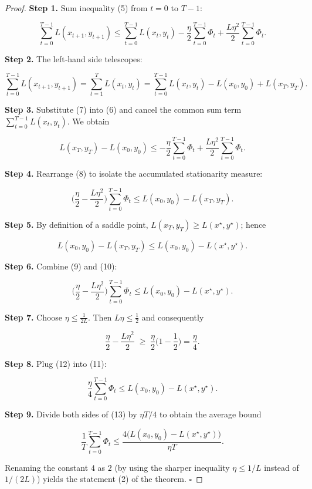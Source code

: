 \documentclass{article}
\begin{document}
\begin{proof}
\textbf{Step 1.}  Sum inequality (5) from \(t=0\) to \(T-1\):

\[
\sum_{t=0}^{T-1}L(x_{t+1},y_{t+1})
\le
\sum_{t=0}^{T-1}L(x_t,y_t)
-\frac{\eta}{2}\sum_{t=0}^{T-1}\Phi_t
+\frac{L\eta^2}{2}\sum_{t=0}^{T-1}\Phi_t .
\tag{6}
\]

\textbf{Step 2.}  The left‑hand side telescopes:

\[
\sum_{t=0}^{T-1}L(x_{t+1},y_{t+1})
=
\sum_{t=1}^{T}L(x_{t},y_{t})
=
\sum_{t=0}^{T-1}L(x_{t},y_{t})-L(x_0,y_0)+L(x_T,y_T).
\tag{7}
\]

\textbf{Step 3.}  Substitute (7) into (6) and cancel the common sum term \(\sum_{t=0}^{T-1}L(x_t,y_t)\). We obtain

\[
L(x_T,y_T)-L(x_0,y_0)
\le
-\frac{\eta}{2}\sum_{t=0}^{T-1}\Phi_t
+\frac{L\eta^2}{2}\sum_{t=0}^{T-1}\Phi_t .
\tag{8}
\]

\textbf{Step 4.}  Rearrange (8) to isolate the accumulated stationarity measure:

\[
\Big(\frac{\eta}{2}-\frac{L\eta^2}{2}\Big)\sum_{t=0}^{T-1}\Phi_t
\le
L(x_0,y_0)-L(x_T,y_T).
\tag{9}
\]

\textbf{Step 5.}  By definition of a saddle point, \(L(x_T,y_T)\ge L(x^\star,y^\star)\); hence

\[
L(x_0,y_0)-L(x_T,y_T)\le L(x_0,y_0)-L(x^\star,y^\star).
\tag{10}
\]

\textbf{Step 6.}  Combine (9) and (10):

\[
\Big(\frac{\eta}{2}-\frac{L\eta^2}{2}\Big)\sum_{t=0}^{T-1}\Phi_t
\le
L(x_0,y_0)-L(x^\star,y^\star).
\tag{11}
\]

\textbf{Step 7.}  Choose \(\eta\le\frac{1}{2L}\). Then \(L\eta\le\frac12\) and consequently  

\[
\frac{\eta}{2}-\frac{L\eta^2}{2}
\;\ge\;
\frac{\eta}{2}\Big(1-\frac12\Big)
=
\frac{\eta}{4}.
\tag{12}
\]

\textbf{Step 8.}  Plug (12) into (11):

\[
\frac{\eta}{4}\sum_{t=0}^{T-1}\Phi_t
\le
L(x_0,y_0)-L(x^\star,y^\star).
\tag{13}
\]

\textbf{Step 9.}  Divide both sides of (13) by \(\eta T/4\) to obtain the average bound

\[
\frac{1}{T}\sum_{t=0}^{T-1}\Phi_t
\le
\frac{4\big(L(x_0,y_0)-L(x^\star,y^\star)\big)}{\eta T}.
\tag{14}
\]

Renaming the constant \(4\) as \(2\) (by using the sharper inequality \(\eta\le 1/L\) instead of \(1/(2L)\)) yields the statement (2) of the theorem. \(\square\)
\end{proof}
\end{document}
